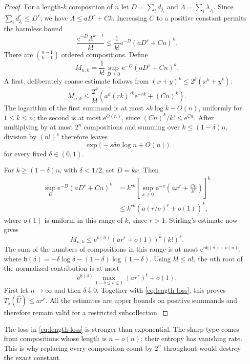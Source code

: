 \documentclass[11pt,a4paper]{article}
\numberwithin{equation}{section}
\theoremstyle{definition}
\theoremstyle{remark}
\theoremstyle{definition}
\newcommand{\U}{\widehat U}
\newcommand{\e}{\mathrm e}
\begin{document}
\begin{proof}
For a length-$k$ composition of $n$ let $D=\sum_i d_{j_i}$ and
$\Lambda=\sum_i\lambda_{j_i}$. Since
$\sum_i d_{j_i}^r\le D^r$, we have $\Lambda\le aD^r+Ck$.
Increasing $C$ to a positive constant permits the harmless bound
\[
 \frac{\e^{-D}\Lambda^{k-1}}{k!}
 \le\frac1{k!}\e^{-D}(aD^r+Cn)^k.
\]
There are $\binom{n-1}{k-1}$ ordered compositions. Define
\[
 M_{n,k}=\frac1{k!}\sup_{D\ge0}\e^{-D}(aD^r+Cn)^k.
\]
A first, deliberately coarse estimate follows from
$(x+y)^k\le2^k(x^k+y^k)$:
\begin{equation}
 M_{n,k}\le\frac{2^k}{k!}
   \left(a^k(rk)^{rk}\e^{-rk}+(Cn)^k\right).
 \label{eq:coarse-type}
\end{equation}
The logarithm of the first summand is at most
$s k\log k+O(n)$, uniformly for $1\le k\le n$; the second is at most
$\e^{O(n)}$, since $(Cn)^k/k!\le\e^{Cn}$. After multiplying by at most
$2^n$ compositions and summing over $k\le(1-\delta)n$, division by
$(n!)^s$ therefore leaves
\begin{equation}
 \exp\bigl(-s\delta n\log n+O(n)\bigr)
 \label{eq:length-loss}
\end{equation}
for every fixed $\delta\in(0,1)$.

For $k\ge(1-\delta)n$, with $\delta<1/2$, set $D=kx$. Then
\begin{align*}
 \sup_D\e^{-D}(aD^r+Cn)^k
 &=k^{rk}\left[\sup_{x\ge0}
          \e^{-x}\left(ax^r+\frac{Cn}{k^r}\right)\right]^k\\
 &\le k^{rk}\left(a(r/\e)^r+o(1)\right)^k,
\end{align*}
where $o(1)$ is uniform in this range of $k$, since $r>1$.
Stirling's estimate now gives
\begin{equation}
 M_{n,k}\le\e^{o(n)}(ar^r+o(1))^k(k!)^s.
 \label{eq:sharp-type}
\end{equation}
The sum of the numbers of compositions in this range is at most
$\e^{n\mathfrak h(\delta)+o(n)}$, where
$\mathfrak h(\delta)=-\delta\log\delta-(1-\delta)\log(1-\delta)$.
Using $k!\le n!$, the $n$th root of the normalized contribution is at
most
\[
 \e^{\mathfrak h(\delta)}
      \max_{1-\delta\le t\le1}(ar^r)^t+o(1).
\]
First let $n\to\infty$ and then $\delta\downarrow0$.
Together with \eqref{eq:length-loss}, this proves $T_s(\U)\le ar^r$.
All the estimates are upper bounds on positive summands and therefore
remain valid for a restricted subcollection.
\end{proof}

The loss in \eqref{eq:length-loss} is stronger than exponential. The
sharp type comes from compositions whose length is $n-o(n)$; their
entropy has vanishing rate. This is why replacing every composition
count by $2^n$ throughout would destroy the exact constant.
\end{document}
